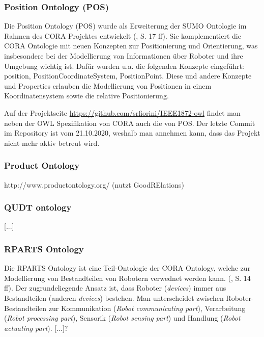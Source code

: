 \documentclass{article}
\begin{document}
\subsubsection{Position Ontology (POS)}


Die Position Ontology (POS) wurde als Erweiterung der SUMO Ontologie im Rahmen des CORA Projektes entwickelt (\cite{fiorini2015extensions}, S. 17 ff).
Sie komplementiert die CORA Ontologie mit neuen Konzepten zur Positionierung und Orientierung, was insbesondere bei der Modellierung von Informationen über Roboter und ihre Umgebung wichtig ist.
Dafür wurden u.a. die folgenden Konzepte eingeführt: position, PositionCoordinateSystem, PositionPoint.
Diese und andere Konzepte und Properties erlauben die Modellierung von Positionen in einem Koordinatensystem sowie die relative Positionierung.

Auf der Projektseite \url{https://github.com/srfiorini/IEEE1872-owl} findet man neben der OWL Spezifikation von CORA auch die von POS. Der letzte Commit im Repository ist vom 21.10.2020, weshalb man annehmen kann, dass das Projekt nicht mehr aktiv betreut wird.

\subsubsection{Product Ontology}

http://www.productontology.org/ (nutzt GoodRElations)

\subsubsection{QUDT ontology}

[...]

\subsubsection{RPARTS Ontology}


Die RPARTS Ontology ist eine Teil-Ontologie der CORA Ontology, welche zur Modellierung von Bestandteilen von Robotern verwednet werden kann. (\cite{fiorini2015extensions}, S. 14 ff).
Der zugrundeliegende Ansatz ist, dass Roboter (\textit{devices}) immer aus Bestandteilen (anderen \textit{devices}) bestehen.
Man unterscheidet zwischen Roboter-Bestandteilen zur Kommunikation (\textit{Robot communicating part}), Verarbeitung (\textit{Robot processing part}), Sensorik (\textit{Robot sensing part}) und Handlung (\textit{Robot actuating part}).
[...]?
\end{document}

